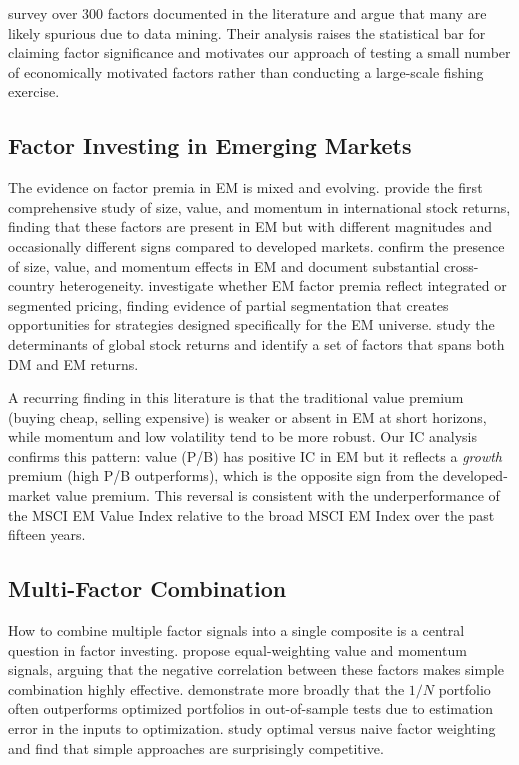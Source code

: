 \documentclass[12pt,a4paper]{article}
\begin{document}
\citet{harvey2016} survey over 300 factors documented in the literature and argue that many are likely spurious due to data mining. Their analysis raises the statistical bar for claiming factor significance and motivates our approach of testing a small number of economically motivated factors rather than conducting a large-scale fishing exercise.

\subsection{Factor Investing in Emerging Markets}

The evidence on factor premia in EM is mixed and evolving. \citet{famafrench2012} provide the first comprehensive study of size, value, and momentum in international stock returns, finding that these factors are present in EM but with different magnitudes and occasionally different signs compared to developed markets. \citet{cakici2013} confirm the presence of size, value, and momentum effects in EM and document substantial cross-country heterogeneity. \citet{hanauer2015} investigate whether EM factor premia reflect integrated or segmented pricing, finding evidence of partial segmentation that creates opportunities for strategies designed specifically for the EM universe. \citet{hou2011} study the determinants of global stock returns and identify a set of factors that spans both DM and EM returns.

A recurring finding in this literature is that the traditional value premium (buying cheap, selling expensive) is weaker or absent in EM at short horizons, while momentum and low volatility tend to be more robust. Our IC analysis confirms this pattern: value (P/B) has positive IC in EM but it reflects a \emph{growth} premium (high P/B outperforms), which is the opposite sign from the developed-market value premium. This reversal is consistent with the underperformance of the MSCI EM Value Index relative to the broad MSCI EM Index over the past fifteen years.

\subsection{Multi-Factor Combination}

How to combine multiple factor signals into a single composite is a central question in factor investing. \citet{asness2013} propose equal-weighting value and momentum signals, arguing that the negative correlation between these factors makes simple combination highly effective. \citet{demiguel2009} demonstrate more broadly that the $1/N$ portfolio often outperforms optimized portfolios in out-of-sample tests due to estimation error in the inputs to optimization. \citet{green2017} study optimal versus naive factor weighting and find that simple approaches are surprisingly competitive.
\end{document}
